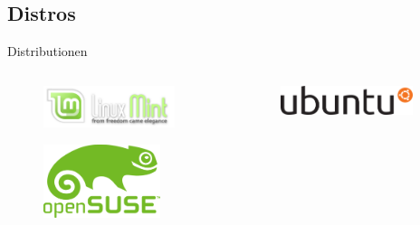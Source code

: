 \subsection{Distros}
\begin{frame}{Distributionen}
\begin{columns}
\begin{column}{0.5\textwidth}
	\begin{figure}
		\includegraphics[width=0.9\textwidth]{resources/640px-Linux_Mint_logo_and_wordmark}
	\end{figure}
	
	\begin{figure}
		\includegraphics[width=0.8\textwidth]{resources/640px-OpenSUSE_Logo}
	\end{figure}
	
\end{column}
\begin{column}{0.5\textwidth}
	
	\begin{figure}
		\includegraphics[width=0.9\textwidth]{resources/640px-Ubuntu_logo}
	\end{figure}
	

\end{column}
\end{columns}
\end{frame}
